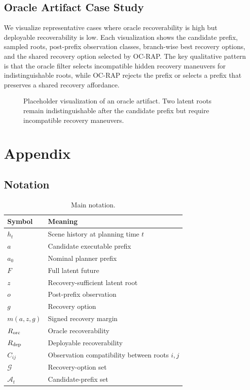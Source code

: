 \documentclass[conference]{IEEEtran}
\begin{document}
\subsection{Oracle Artifact Case Study}
\label{subsec:case_study}

We visualize representative cases where oracle recoverability is high but deployable recoverability is low.  Each visualization shows the candidate prefix, sampled roots, post-prefix observation classes, branch-wise best recovery options, and the shared recovery option selected by OC-RAP.  The key qualitative pattern is that the oracle filter selects incompatible hidden recovery maneuvers for indistinguishable roots, while OC-RAP rejects the prefix or selects a prefix that preserves a shared recovery affordance.

\begin{figure}[t]
\centering
\fbox{\rule{0pt}{1.8in}\rule{0.95\linewidth}{0pt}}
\caption{Placeholder visualization of an oracle artifact.  Two latent roots remain indistinguishable after the candidate prefix but require incompatible recovery maneuvers.}
\label{fig:oracle_artifact}
\end{figure}


\appendix

\section{Appendix}
\label{sec:appendix}

\subsection{Notation}
\label{app:notation}

\begin{table}[h]
\centering
\caption{Main notation.}
\label{tab:notation}
\begin{tabular}{ll}
\toprule
Symbol & Meaning \\
\midrule
$h_t$ & Scene history at planning time $t$ \\
$a$ & Candidate executable prefix \\
$a_0$ & Nominal planner prefix \\
$F$ & Full latent future \\
$z$ & Recovery-sufficient latent root \\
$o$ & Post-prefix observation \\
$g$ & Recovery option \\
$m(a,z,g)$ & Signed recovery margin \\
$R_{\rm orc}$ & Oracle recoverability \\
$R_{\rm dep}$ & Deployable recoverability \\
$C_{ij}$ & Observation compatibility between roots $i,j$ \\
$\mathcal{G}$ & Recovery-option set \\
$\mathcal{A}_t$ & Candidate-prefix set \\
\bottomrule
\end{tabular}
\end{table}
\end{document}
